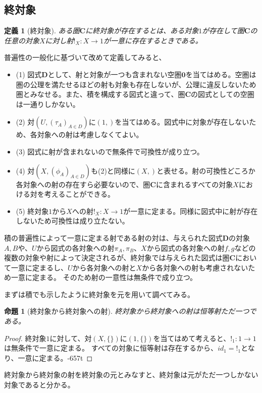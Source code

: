 \documentclass[dvipdfmx]{jsarticle}
\newcommand{\cat}[1]{\boldsymbol{#1}}
\newcommand{\arrow}{\rightarrow}
\newcommand{\mor}[3]{#1:#2\arrow #3}
\newtheorem{proof}{証明}[section]
\newtheorem{prop}{命題}[section]
\newtheorem{define}{定義}[section]
\begin{document}
	\subsection{終対象}
	\begin{define}[終対象]
		ある圏$\cat{C}$に終対象が存在するとは、ある対象$1$が存在して圏$\cat{C}$の任意の対象$X$に対し射$\mor{!_X}{X}{1}$が一意に存在するときである。
	\end{define}
	普遍性の一般化に基づいて改めて定義してみると、
	\begin{itemize}
		\item (1)
		図式$\cat{D}$として、射と対象が一つも含まれない空圏$\cat{0}$を当てはめる。空圏は圏の公理を満たせるほどの射も対象も存在しないが、公理に違反しないため圏とみなせる。また、積を構成する図式と違って、圏$\cat{C}$の図式としての空圏は一通りしかない。
		\item (2)
		対$(U,(\tau_A)_{A\in D})$に$(1,{})$を当てはめる。図式中に対象が存在しないため、各対象への射は考慮しなくてよい。
		\item (3)
		図式に射が含まれないので無条件で可換性が成り立つ。
		\item (4)
		対$(X,(\phi_A)_{A\in D})$も(2)と同様に$(X,{})$と表せる。射の可換性どころか各対象への射の存在すら必要ないので、圏$\cat{C}$に含まれるすべての対象$X$における対を考えることができる。
		\item (5)
		終対象$1$から$X$への射$\mor{!_X}{X}{1}$が一意に定まる。同様に図式中に射が存在しないため可換性は成り立たない。
	\end{itemize}
	積の普遍性によって一意に定まる射である射の対は、与えられた図式$\cat{D}$の対象$A,B$や、$U$から図式の各対象への射$\pi_A,\pi_B$、$X$から図式の各対象への射$f,g$などの複数の対象や射によって決定されるが、終対象では与えられた図式は圏$\cat{C}$において一意に定まるし、$U$から各対象への射と$X$から各対象への射も考慮されないため一意に定まる。
	そのため射の一意性は無条件で成り立つ。

	まずは積でも示したように終対象を元を用いて調べてみる。
	\begin{prop}[終対象から終対象への射]
		終対象から終対象への射は恒等射ただ一つである。
	\end{prop}
	\begin{proof}
		終対象$1$に対して、対$(X,\{\})$に$(1,\{\})$を当てはめて考えると、$\mor{!_1}{1}{1}$は無条件で一意に定まる。
		すべての対象に恒等射は存在するから、$id_1=!_1$となり、一意に定まる。-657t
	\end{proof}
	終対象から終対象の射を終対象の元とみなすと、終対象は元がただ一つしかない対象であると分かる。
\end{document}
